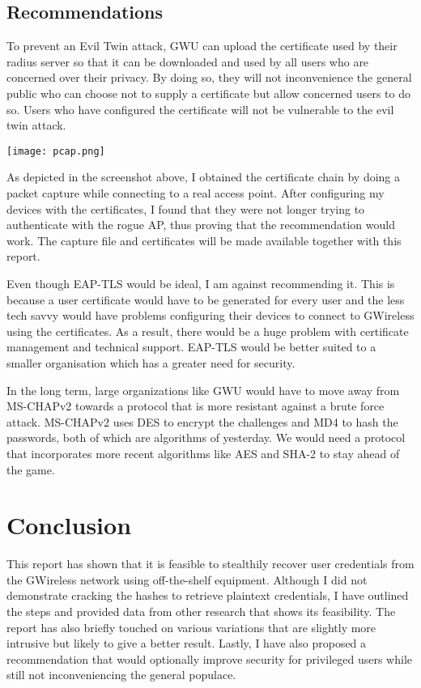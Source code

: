 \documentclass[twoside]{article}
\begin{document}
\begin{multicols}{2}
\section{Recommendations}

To prevent an Evil Twin attack, GWU can upload the certificate used by their radius server so that it can be downloaded and used by all users who are concerned over their privacy. By doing so, they will not inconvenience the general public who can choose not to supply a certificate but allow concerned users to do so. Users who have configured the certificate will not be vulnerable to the evil twin attack.


\end{multicols}
\texttt{[image: pcap.png]}
\begin{multicols}{2}

As depicted in the screenshot above, I obtained the certificate chain by doing a packet capture while connecting to a real access point. After configuring my devices with the certificates, I found that they were not longer trying to authenticate with the rogue AP, thus proving that the recommendation would work. The capture file and certificates will be made available together with this report. 

Even though EAP-TLS would be ideal, I am against recommending it. This is because a user certificate would have to be generated for every user and the less tech savvy would have problems configuring their devices to connect to GWireless using the certificates. As a result, there would be a huge problem with certificate management and technical support. EAP-TLS would be better suited to a smaller organisation which has a greater need for security.

In the long term, large organizations like GWU would have to move away from MS-CHAPv2 towards a protocol that is more resistant against a brute force attack. MS-CHAPv2 uses DES to encrypt the challenges and MD4 to hash the passwords, both of which are algorithms of yesterday. We would need a protocol that incorporates more recent algorithms like AES and SHA-2 to stay ahead of the game.



\section{Conclusion}

This report has shown that it is feasible to stealthily recover user credentials from the GWireless network using off-the-shelf equipment. Although I did not demonstrate cracking the hashes to retrieve plaintext credentials, I have outlined the steps and provided data from other research that shows its feasibility. The report has also briefly touched on various variations that are slightly more intrusive but likely to give a better result. Lastly, I have also proposed a recommendation that would optionally improve security for privileged users while still not inconveniencing the general populace. 

\end{multicols}
\end{document}
